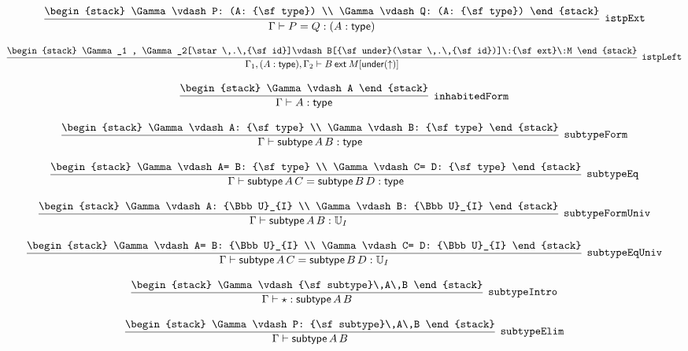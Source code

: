 \[
\infer[{\tt istpExt}]{\Gamma \vdash P= Q: (A: {\sf type})}{
\begin{stack}
\Gamma \vdash P: (A: {\sf type})
\\
\Gamma \vdash Q: (A: {\sf type})
\end{stack}}
\]

\[
\infer[{\tt istpLeft}]{\Gamma_1 ,(A: {\sf type}), \Gamma_2 \vdash B\:{\sf ext}\:M[{\sf under}(\uparrow )]}{
\begin{stack}
\Gamma_1 , \Gamma_2[\star \,.\,{\sf id}]\vdash B[{\sf under}(\star \,.\,{\sf id})]\:{\sf ext}\:M
\end{stack}}
\]

\[
\infer[{\tt inhabitedForm}]{\Gamma \vdash A: {\sf type}}{
\begin{stack}
\Gamma \vdash A
\end{stack}}
\]

\[
\infer[{\tt subtypeForm}]{\Gamma \vdash {\sf subtype}\,A\,B: {\sf type}}{
\begin{stack}
\Gamma \vdash A: {\sf type}
\\
\Gamma \vdash B: {\sf type}
\end{stack}}
\]

\[
\infer[{\tt subtypeEq}]{\Gamma \vdash {\sf subtype}\,A\,C= {\sf subtype}\,B\,D: {\sf type}}{
\begin{stack}
\Gamma \vdash A= B: {\sf type}
\\
\Gamma \vdash C= D: {\sf type}
\end{stack}}
\]

\[
\infer[{\tt subtypeFormUniv}]{\Gamma \vdash {\sf subtype}\,A\,B: {\Bbb U}_{I}}{
\begin{stack}
\Gamma \vdash A: {\Bbb U}_{I}
\\
\Gamma \vdash B: {\Bbb U}_{I}
\end{stack}}
\]

\[
\infer[{\tt subtypeEqUniv}]{\Gamma \vdash {\sf subtype}\,A\,C= {\sf subtype}\,B\,D: {\Bbb U}_{I}}{
\begin{stack}
\Gamma \vdash A= B: {\Bbb U}_{I}
\\
\Gamma \vdash C= D: {\Bbb U}_{I}
\end{stack}}
\]

\[
\infer[{\tt subtypeIntro}]{\Gamma \vdash \star : {\sf subtype}\,A\,B}{
\begin{stack}
\Gamma \vdash {\sf subtype}\,A\,B
\end{stack}}
\]

\[
\infer[{\tt subtypeElim}]{\Gamma \vdash {\sf subtype}\,A\,B}{
\begin{stack}
\Gamma \vdash P: {\sf subtype}\,A\,B
\end{stack}}
\]

